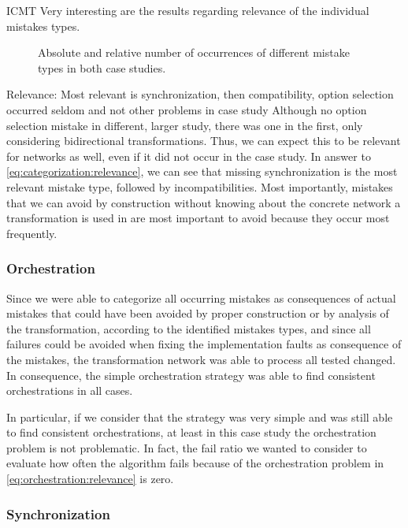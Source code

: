 \begin{copiedFrom}{ICMT}
Very interesting are the results regarding relevance of the individual mistakes types.

\begin{figure}
    
    \caption[Number of occurrences of mistake types]{Absolute and relative number of occurrences of different mistake types in both case studies.}
    \label{fig:correctness_evaluation:errors:mistake_type_numbers}
\end{figure}

Relevance: Most relevant is synchronization, then compatibility, option selection occurred seldom and not other problems in case study
Although no option selection mistake in different, larger study, there was one in the first, only considering bidirectional transformations. Thus, we can expect this to be relevant for networks as well, even if it did not occur in the case study.
In answer to \autoref{eq:categorization:relevance}, we can see that missing synchronization is the most relevant mistake type, followed by incompatibilities.
Most importantly, mistakes that we can avoid by construction without knowing about the concrete network a transformation is used in are most important to avoid because they occur most frequently.

\subsubsection{Orchestration}

Since we were able to categorize all occurring mistakes as consequences of actual mistakes that could have been avoided by proper construction or by analysis of the transformation, according to the identified mistakes types, and since all failures could be avoided when fixing the implementation faults as consequence of the mistakes, the transformation network was able to process all tested changed.
In consequence, the simple orchestration strategy was able to find consistent orchestrations in all cases.

In particular, if we consider that the strategy was very simple and was still able to find consistent orchestrations, at least in this case study the orchestration problem is not problematic.
In fact, the fail ratio we wanted to consider to evaluate how often the algorithm fails because of the orchestration problem in \autoref{eq:orchestration:relevance} is zero.


\subsubsection{Synchronization}


\end{copiedFrom}
